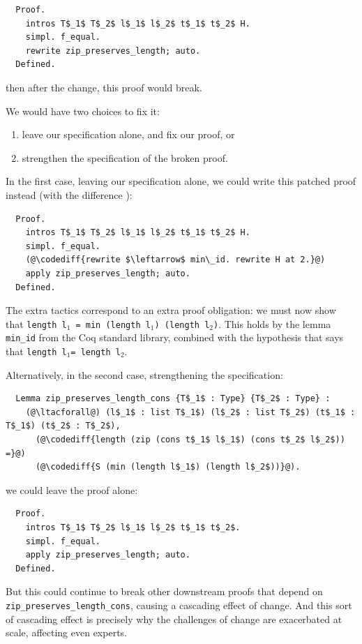\begin{lstlisting}
  Proof.
    intros T$_1$ T$_2$ l$_1$ l$_2$ t$_1$ t$_2$ H.
    simpl. f_equal.
    rewrite zip_preserves_length; auto.
  Defined.
\end{lstlisting}
then after the change, this proof would break.

We would have two choices to fix it:

\begin{enumerate}
\item leave our specification alone, and fix our proof, or
\item strengthen the specification of the broken proof.
\end{enumerate}

In the first case, leaving our specification alone, we could write this patched proof instead (with the difference ):

\begin{lstlisting}
  Proof.
    intros T$_1$ T$_2$ l$_1$ l$_2$ t$_1$ t$_2$ H.
    simpl. f_equal.
    (@\codediff{rewrite $\leftarrow$ min\_id. rewrite H at 2.}@)
    apply zip_preserves_length; auto.
  Defined.
\end{lstlisting}
The extra tactics correspond to an extra proof obligation:
we must now show that \lstinline{length l}$_1$\lstinline{ = min (length l}$_1$\lstinline{) (length l}$_2$\lstinline{)}.
This holds by the lemma \lstinline{min_id} from the Coq standard library, combined with the hypothesis that says that \lstinline{length l}$_1$\lstinline{= length l}$_2$.

Alternatively, in the second case, strengthening the specification:
\begin{lstlisting}
  Lemma zip_preserves_length_cons {T$_1$ : Type} {T$_2$ : Type} :
    (@\ltacforall@) (l$_1$ : list T$_1$) (l$_2$ : list T$_2$) (t$_1$ : T$_1$) (t$_2$ : T$_2$),
      (@\codediff{length (zip (cons t$_1$ l$_1$) (cons t$_2$ l$_2$)) =}@)
      (@\codediff{S (min (length l$_1$) (length l$_2$))}@).
\end{lstlisting}

we could leave the proof alone:
\begin{lstlisting}
  Proof.
    intros T$_1$ T$_2$ l$_1$ l$_2$ t$_1$ t$_2$.
    simpl. f_equal.
    apply zip_preserves_length; auto.
  Defined.
\end{lstlisting}
But this could continue to break other downstream proofs that depend on \lstinline{zip_preserves_length_cons},
causing a cascading effect of change.
And this sort of cascading effect is precisely why the challenges of change are exacerbated at scale,
affecting even experts.

